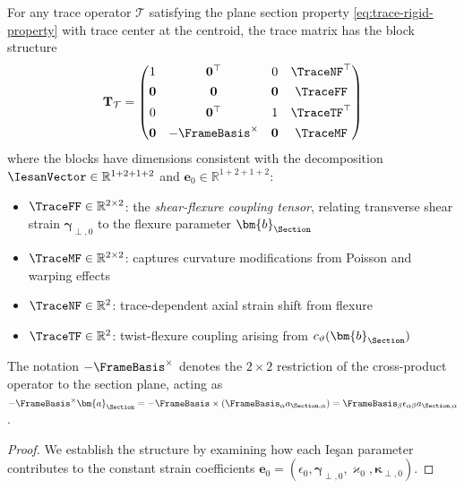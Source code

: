 \begin{Old}
\begin{proposition}
\label{prop:trace-matrix-structure}
For any trace operator $\mathcal{T}$ satisfying the plane section property 
\eqref{eq:trace-rigid-property} with trace center at the centroid, the trace 
matrix has the block structure
\begin{equation}
\mathbf{T}_{\mathcal{T}} = \begin{pmatrix}
1 & \mathbf{0}^\top & 0 & \TraceNF^\top \\[4pt]
\mathbf{0} & \mathbf{0} & \mathbf{0} & \TraceFF \\[4pt]
0 & \mathbf{0}^\top & 1 & \TraceTF^\top \\[4pt]
\mathbf{0} & -\FrameBasis^{\times} & \mathbf{0} & \TraceMF
\end{pmatrix}
\label{eq:trace-matrix-structure}
\end{equation}
where the blocks have dimensions consistent with the decomposition 
$\IesanVector \in \mathbb{R}^{1+2+1+2}$ and $\bm{e}_0 \in \mathbb{R}^{1+2+1+2}$:
\begin{itemize}
\item $\TraceFF \in \mathbb{R}^{2 \times 2}$: the \emph{shear-flexure coupling tensor}, 
relating transverse shear strain $\bm{\gamma}_{\perp,0}$ to the flexure parameter $\bm{b}_{\Section}$
\item $\TraceMF \in \mathbb{R}^{2 \times 2}$: captures curvature modifications 
from Poisson and warping effects
\item $\TraceNF \in \mathbb{R}^{2}$: trace-dependent axial strain shift from flexure
\item $\TraceTF \in \mathbb{R}^{2}$: twist-flexure coupling arising from $c_\vartheta(\bm{b}_{\Section})$
\end{itemize}
The notation $-\FrameBasis^{\times}$ denotes the $2 \times 2$ restriction of 
the cross-product operator to the section plane, acting as 
$-\FrameBasis^{\times}\bm{a}_{\Section} = -\FrameBasis \times (\FrameBasis_\alpha a_{\Section,\alpha}) 
= \FrameBasis_\beta \epsilon_{\alpha\beta} a_{\Section,\alpha}$.
\end{proposition}

\begin{proof}
We establish the structure by examining how each Ieşan parameter contributes 
to the constant strain coefficients $\bm{e}_0 = (\epsilon_{0}, \bm{\gamma}_{\perp,0}, 
\varkappa_0, \bm{\kappa}_{\perp,0})$.


\end{proof}
\end{Old}
